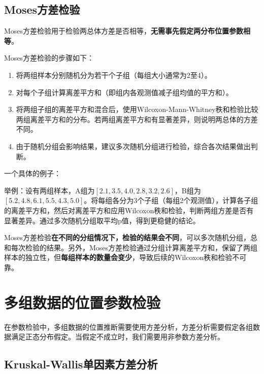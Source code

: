 \documentclass[
]{book}
\begin{document}
\subsection{Moses方差检验}\label{mosesux65b9ux5deeux68c0ux9a8c}

Moses方差检验用于检验两总体方差是否相等，\textbf{无需事先假定两分布位置参数相等}。

Moses方差检验的步骤如下：

\begin{enumerate}
\def\labelenumi{\arabic{enumi}.}
\item
  将两组样本分别随机分为若干个子组（每组大小通常为2至4）。
\item
  对每个子组计算离差平方和（即组内各观测值减子组均值的平方和）。
\item
  将两组子组的离差平方和混合后，使用Wilcoxon-Mann-Whitney秩和检验比较两组离差平方和的分布。若两组离差平方和有显著差异，则说明两总体的方差不同。
\item
  由于随机分组会影响结果，建议多次随机分组进行检验，综合各次结果做出判断。
\end{enumerate}

一个具体的例子：

举例：设有两组样本，A组为\([2.1, 3.5, 4.0, 2.8, 3.2, 2.6]\)，B组为\([5.2, 4.8, 6.1, 5.5, 4.3, 5.0]\)。将每组各分为3个子组（每组2个观测值），计算各子组的离差平方和，然后对离差平方和应用Wilcoxon秩和检验，判断两组方差是否有显著差异。通过多次随机分组取平均p值，得到更稳健的结论。

Moses方差检验\textbf{在不同的分组情况下，检验的结果会不同}，可以多次随机分组，总和每次检验的结果。另外，Moses方差检验通过分组计算离差平方和，保留了两组样本的独立性，但\textbf{每组样本的数量会变少}，导致后续的Wilcoxon秩和检验不可靠。

\section{多组数据的位置参数检验}\label{ux591aux7ec4ux6570ux636eux7684ux4f4dux7f6eux53c2ux6570ux68c0ux9a8c}

在参数检验中，多组数据的位置推断需要使用方差分析，方差分析需要假定各组数据满足正态分布假定。当假定不成立时，我们需要用非参数方差分析。

\subsection{Kruskal-Wallis单因素方差分析}\label{kruskal-wallisux5355ux56e0ux7d20ux65b9ux5deeux5206ux6790}
\end{document}
